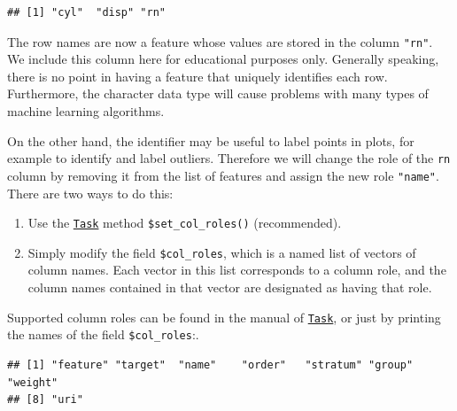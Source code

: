 \documentclass[
]{scrbook}
\newenvironment{Shaded}{\begin{snugshade}}{\end{snugshade}}
\newcommand{\AttributeTok}[1]{\textcolor[rgb]{0.77,0.63,0.00}{#1}}
\newcommand{\CommentTok}[1]{\textcolor[rgb]{0.56,0.35,0.01}{\textit{#1}}}
\newcommand{\FunctionTok}[1]{\textcolor[rgb]{0.00,0.00,0.00}{#1}}
\newcommand{\NormalTok}[1]{#1}
\newcommand{\SpecialCharTok}[1]{\textcolor[rgb]{0.00,0.00,0.00}{#1}}
\newcommand{\StringTok}[1]{\textcolor[rgb]{0.31,0.60,0.02}{#1}}
\providecommand{\tightlist}{%
  \setlength{\itemsep}{0pt}\setlength{\parskip}{0pt}}
\renewenvironment{Shaded} {\begin{snugshade}\small} {\end{snugshade}}
\begin{document}
\begin{verbatim}
## [1] "cyl"  "disp" "rn"
\end{verbatim}

The row names are now a feature whose values are stored in the column \texttt{"rn"}.
We include this column here for educational purposes only.
Generally speaking, there is no point in having a feature that uniquely identifies each row.
Furthermore, the character data type will cause problems with many types of machine learning algorithms.

On the other hand, the identifier may be useful to label points in plots, for example to identify and label outliers.
Therefore we will change the role of the \texttt{rn} column by removing it from the list of features and assign the new role \texttt{"name"}.
There are two ways to do this:

\begin{enumerate}
\def\labelenumi{\arabic{enumi}.}
\tightlist
\item
  Use the \href{https://mlr3.mlr-org.com/reference/Task.html}{\texttt{Task}} method \texttt{\$set\_col\_roles()} (recommended).
\item
  Simply modify the field \texttt{\$col\_roles}, which is a named list of vectors of column names.
  Each vector in this list corresponds to a column role, and the column names contained in that vector are designated as having that role.
\end{enumerate}

Supported column roles can be found in the manual of \href{https://mlr3.mlr-org.com/reference/Task.html}{\texttt{Task}}, or just by printing the names of the field \texttt{\$col\_roles}:.

\begin{Shaded}
\end{Shaded}

\begin{verbatim}
## [1] "feature" "target"  "name"    "order"   "stratum" "group"   "weight" 
## [8] "uri"
\end{verbatim}

\begin{Shaded}
\end{Shaded}
\end{document}
